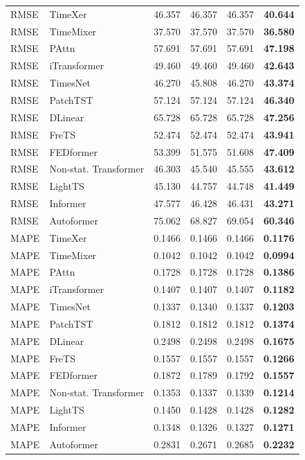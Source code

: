 \begin{longtable}{llrrrr}
\midrule
RMSE & TimeXer & 46.357 & 46.357 & 46.357 & \textbf{40.644} \\
RMSE & TimeMixer & 37.570 & 37.570 & 37.570 & \textbf{36.580} \\
RMSE & PAttn & 57.691 & 57.691 & 57.691 & \textbf{47.198} \\
RMSE & iTransformer & 49.460 & 49.460 & 49.460 & \textbf{42.643} \\
RMSE & TimesNet & 46.270 & 45.808 & 46.270 & \textbf{43.374} \\
RMSE & PatchTST & 57.124 & 57.124 & 57.124 & \textbf{46.340} \\
RMSE & DLinear & 65.728 & 65.728 & 65.728 & \textbf{47.256} \\
RMSE & FreTS & 52.474 & 52.474 & 52.474 & \textbf{43.941} \\
RMSE & FEDformer & 53.399 & 51.575 & 51.608 & \textbf{47.409} \\
RMSE & Non-stat. Transformer & 46.303 & 45.540 & 45.555 & \textbf{43.612} \\
RMSE & LightTS & 45.130 & 44.757 & 44.748 & \textbf{41.449} \\
RMSE & Informer & 47.577 & 46.428 & 46.431 & \textbf{43.271} \\
RMSE & Autoformer & 75.062 & 68.827 & 69.054 & \textbf{60.346} \\
\midrule
MAPE & TimeXer & 0.1466 & 0.1466 & 0.1466 & \textbf{0.1176} \\
MAPE & TimeMixer & 0.1042 & 0.1042 & 0.1042 & \textbf{0.0994} \\
MAPE & PAttn & 0.1728 & 0.1728 & 0.1728 & \textbf{0.1386} \\
MAPE & iTransformer & 0.1407 & 0.1407 & 0.1407 & \textbf{0.1182} \\
MAPE & TimesNet & 0.1337 & 0.1340 & 0.1337 & \textbf{0.1203} \\
MAPE & PatchTST & 0.1812 & 0.1812 & 0.1812 & \textbf{0.1374} \\
MAPE & DLinear & 0.2498 & 0.2498 & 0.2498 & \textbf{0.1675} \\
MAPE & FreTS & 0.1557 & 0.1557 & 0.1557 & \textbf{0.1266} \\
MAPE & FEDformer & 0.1872 & 0.1789 & 0.1792 & \textbf{0.1557} \\
MAPE & Non-stat. Transformer & 0.1353 & 0.1337 & 0.1339 & \textbf{0.1214} \\
MAPE & LightTS & 0.1450 & 0.1428 & 0.1428 & \textbf{0.1282} \\
MAPE & Informer & 0.1348 & 0.1326 & 0.1327 & \textbf{0.1271} \\
MAPE & Autoformer & 0.2831 & 0.2671 & 0.2685 & \textbf{0.2232} \\
\end{longtable}
\endgroup

